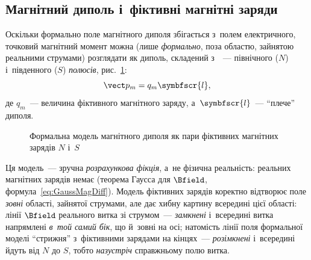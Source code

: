 \subsection*{Магнітний диполь і~фіктивні магнітні заряди}\label{sec:MagDipoleCharges}


Оскільки формально поле магнітного диполя збігається з~полем електричного, точковий
магнітний момент можна (лише \emph{формально}, поза областю, зайнятою реальними струмами)
розглядати як диполь, складений з~~--- північного
($N$) і~південного ($S$) \emph{полюсів}, рис.~\ref{pic:DipoleCharges}:
\begin{equation*}
	\vect p_m = q_m\symbfscr{l},
\end{equation*}
де $q_m$~--- величина фіктивного магнітного заряду, а~$\symbfscr{l}$~--- \enquote{плече}
диполя.

\begin{figure}\centering
	\caption{Формальна модель магнітного диполя як пари фіктивних магнітних зарядів $N$
		і~$S$\label{pic:DipoleCharges}}
\end{figure}

\begin{Attention}[unbreakable]
	Ця модель~--- зручна \emph{розрахункова фікція}, а~не фізична реальність: реальних
	магнітних зарядів немає (теорема Гаусса для $\Bfield$,
	формула~\eqref{eq:GaussMagDiff}). Модель фіктивних зарядів коректно відтворює поле
	\emph{зовні} області, зайнятої струмами, але дає хибну картину всередині цієї
	області: лінії $\Bfield$ реального витка зі струмом~--- \emph{замкнені} і~всередині
	витка напрямлені \emph{в~той самий бік}, що й~зовні на осі; натомість лінії поля
	формальної моделі \enquote{стрижня} з~фіктивними зарядами на кінцях~---
	\emph{розімкнені} і~всередині йдуть від $N$ до $S$, тобто \emph{назустріч}
	справжньому полю витка.
\end{Attention}

